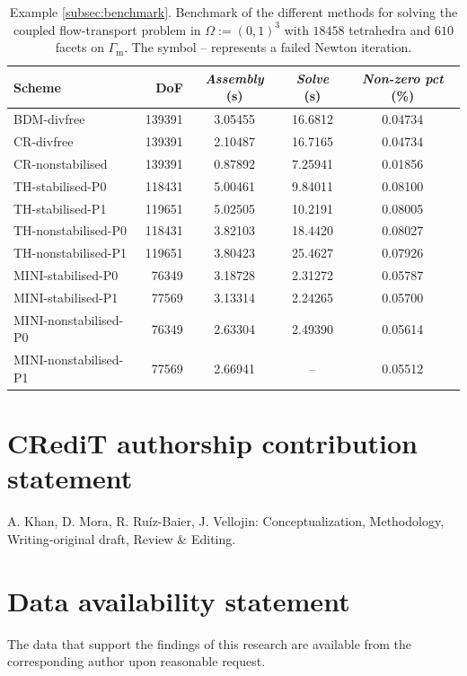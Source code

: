 \documentclass[onefignum,onetabnum,reqno,a4paper,final]{siamart250211}
\def\O{\Omega}
\newcommand\0{\mathbf{0}}
\renewcommand\O{\Omega}
\newcommand\Gm{\Gamma_{\mathrm{m}}}
\numberwithin{figure}{section}
\numberwithin{table}{section}
\begin{document}
{\begin{table}[!h]\centering
	{
		\caption{Example \ref{subsec:benchmark}. Benchmark of the different methods for solving the coupled flow-transport problem in $\O:=(0,1)^3$ with $18458$ tetrahedra and $610$ facets on $\Gm$. The symbol -- represents a failed Newton iteration.}
\begin{tabular}{lrccc}
\hline
\hline
	Scheme & DoF & \emph{Assembly} (s) & \emph{Solve} (s) & \emph{Non-zero pct} (\%)  \\ \midrule
	BDM-divfree             & 139391          &   3.05455    &  16.6812  &     0.04734          \\
	CR-divfree              & 139391          &   2.10487    &  16.7165  &     0.04734       \\
    CR-nonstabilised        & 139391          &   0.87892    &  7.25941  &      0.01856      \\
	TH-stabilised-P0        & 118431         &   5.00461    &  9.84011  &      0.08100     \\
    TH-stabilised-P1        & 119651         &   5.02505    &  10.2191  &     0.08005      \\
	TH-nonstabilised-P0     & 118431          &   3.82103    &  18.4420  &    0.08027     \\
    TH-nonstabilised-P1     & 119651          &   3.80423    &  25.4627  &    0.07926      \\
    MINI-stabilised-P0       & 76349         &   3.18728    &  2.31272  &      0.05787   \\
    MINI-stabilised-P1       & 77569         &   3.13314    &  2.24265  &     0.05700     \\
	MINI-nonstabilised-P0   & 76349          &   2.63304    &  2.49390  &    0.05614     \\
    MINI-nonstabilised-P1   & 77569          &   2.66941    &  --  &    0.05512        \\
    \hline
    \hline
\end{tabular}}
\label{tabla:benchmark3D}
\end{table}


\section*{CRediT authorship contribution statement}
A. Khan, D. Mora, R. Ruíz-Baier, J. Vellojin: Conceptualization,
Methodology, Writing-original draft, Review $\&$ Editing.

\section*{Data availability statement}
The data that support the findings of this research are available from the corresponding author upon reasonable request.

}
\end{document}
